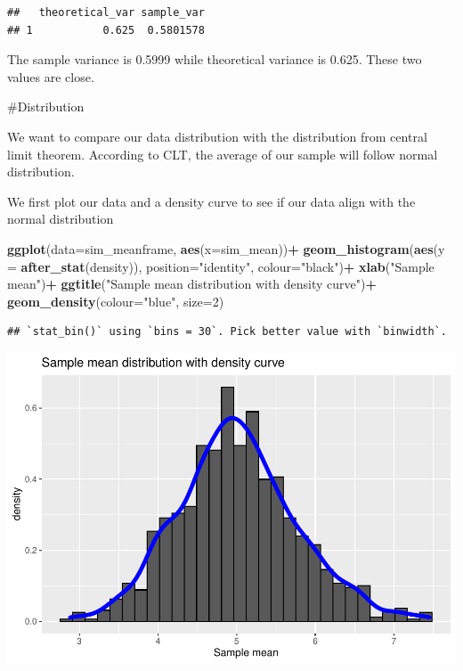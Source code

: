 \documentclass[
]{article}
\newenvironment{Shaded}{\begin{snugshade}}{\end{snugshade}}
\newcommand{\DataTypeTok}[1]{\textcolor[rgb]{0.13,0.29,0.53}{#1}}
\newcommand{\DecValTok}[1]{\textcolor[rgb]{0.00,0.00,0.81}{#1}}
\newcommand{\KeywordTok}[1]{\textcolor[rgb]{0.13,0.29,0.53}{\textbf{#1}}}
\newcommand{\NormalTok}[1]{#1}
\newcommand{\OperatorTok}[1]{\textcolor[rgb]{0.81,0.36,0.00}{\textbf{#1}}}
\newcommand{\StringTok}[1]{\textcolor[rgb]{0.31,0.60,0.02}{#1}}
\begin{document}
\begin{verbatim}
##   theoretical_var sample_var
## 1           0.625  0.5801578
\end{verbatim}

The sample variance is 0.5999 while theoretical variance is 0.625. These
two values are close.

\#Distribution

We want to compare our data distribution with the distribution from
central limit theorem. According to CLT, the average of our sample will
follow normal distribution.

We first plot our data and a density curve to see if our data align with
the normal distribution

\begin{Shaded}
\begin{Highlighting}[]
\KeywordTok{ggplot}\NormalTok{(}\DataTypeTok{data=}\NormalTok{sim_meanframe, }\KeywordTok{aes}\NormalTok{(}\DataTypeTok{x=}\NormalTok{sim_mean))}\OperatorTok{+}
\StringTok{       }\KeywordTok{geom_histogram}\NormalTok{(}\KeywordTok{aes}\NormalTok{(}\DataTypeTok{y =} \KeywordTok{after_stat}\NormalTok{(density)), }\DataTypeTok{position=}\StringTok{"identity"}\NormalTok{, }\DataTypeTok{colour=}\StringTok{"black"}\NormalTok{)}\OperatorTok{+}
\StringTok{       }\KeywordTok{xlab}\NormalTok{(}\StringTok{"Sample mean"}\NormalTok{)}\OperatorTok{+}
\StringTok{        }\KeywordTok{ggtitle}\NormalTok{(}\StringTok{"Sample mean distribution with density curve"}\NormalTok{)}\OperatorTok{+}
\StringTok{        }\KeywordTok{geom_density}\NormalTok{(}\DataTypeTok{colour=}\StringTok{"blue"}\NormalTok{, }\DataTypeTok{size=}\DecValTok{2}\NormalTok{)}
\end{Highlighting}
\end{Shaded}

\begin{verbatim}
## `stat_bin()` using `bins = 30`. Pick better value with `binwidth`.
\end{verbatim}

\includegraphics{StatisticalInference_Project_Week4_files/figure-latex/unnamed-chunk-11-1.pdf}
\end{document}
